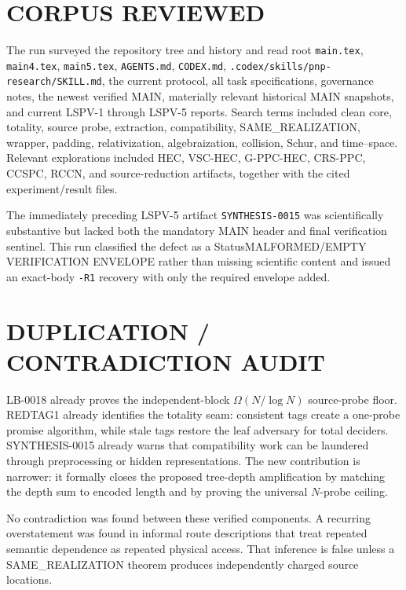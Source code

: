 \documentclass[11pt]{article}
\begin{document}
\section{CORPUS REVIEWED}

The run surveyed the repository tree and history and read root \texttt{main.tex}, \texttt{main4.tex}, \texttt{main5.tex}, \texttt{AGENTS.md}, \texttt{CODEX.md}, \texttt{.codex/skills/pnp-research/SKILL.md}, the current protocol, all task specifications, governance notes, the newest verified MAIN, materially relevant historical MAIN snapshots, and current LSPV-1 through LSPV-5 reports.  Search terms included clean core, totality, source probe, extraction, compatibility, SAME\_REALIZATION, wrapper, padding, relativization, algebraization, collision, Schur, and time--space.  Relevant explorations included HEC, VSC-HEC, G-PPC-HEC, CRS-PPC, CCSPC, RCCN, and source-reduction artifacts, together with the cited experiment/result files.

The immediately preceding LSPV-5 artifact \texttt{SYNTHESIS-0015} was scientifically substantive but lacked both the mandatory MAIN header and final verification sentinel.  This run classified the defect as a Status{MALFORMED/EMPTY VERIFICATION ENVELOPE} rather than missing scientific content and issued an exact-body \texttt{-R1} recovery with only the required envelope added.

\section{DUPLICATION / CONTRADICTION AUDIT}

LB-0018 already proves the independent-block $\Omega(N/\log N)$ source-probe floor.  REDTAG1 already identifies the totality seam: consistent tags create a one-probe promise algorithm, while stale tags restore the leaf adversary for total deciders.  SYNTHESIS-0015 already warns that compatibility work can be laundered through preprocessing or hidden representations.  The new contribution is narrower: it formally closes the proposed tree-depth amplification by matching the depth sum to encoded length and by proving the universal $N$-probe ceiling.

No contradiction was found between these verified components.  A recurring overstatement was found in informal route descriptions that treat repeated semantic dependence as repeated physical access.  That inference is false unless a SAME\_REALIZATION theorem produces independently charged source locations.
\end{document}
